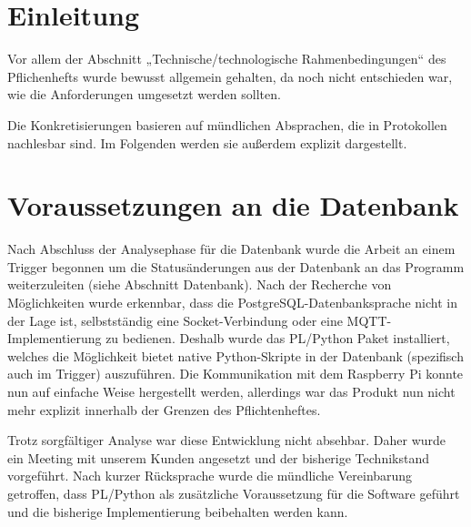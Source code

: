 \documentclass{scrartcl}
\date{}
\begin{document}
\maketitle
\renewcommand{\maketitle}{}
\renewcommand{\tableofcontents}{}

\section{Einleitung}
Vor allem der Abschnitt „Technische/technologische Rahmenbedingungen“ des Pflichenhefts wurde bewusst allgemein gehalten, da noch nicht entschieden war, wie die Anforderungen umgesetzt werden sollten. 

Die Konkretisierungen basieren auf mündlichen Absprachen, die in Protokollen nachlesbar sind. Im Folgenden werden sie außerdem explizit dargestellt.

\section{Voraussetzungen an die Datenbank}
Nach Abschluss der Analysephase für die Datenbank wurde die Arbeit an einem Trigger begonnen um die Statusänderungen aus der Datenbank an das Programm weiterzuleiten (siehe Abschnitt Datenbank). Nach der Recherche von Möglichkeiten wurde erkennbar, dass die PostgreSQL-Datenbanksprache nicht in der Lage ist, selbstständig eine Socket-Verbindung oder eine MQTT-Implementierung zu bedienen. Deshalb wurde das PL/Python Paket installiert, welches die Möglichkeit bietet native Python-Skripte in der Datenbank (spezifisch auch im Trigger) auszuführen. Die Kommunikation mit dem Raspberry Pi konnte nun auf einfache Weise hergestellt werden, allerdings war das Produkt nun nicht mehr explizit innerhalb der Grenzen des Pflichtenheftes.

Trotz sorgfältiger Analyse war diese Entwicklung nicht absehbar. Daher wurde ein Meeting mit unserem Kunden angesetzt und der bisherige Technikstand vorgeführt. Nach kurzer Rücksprache wurde die mündliche Vereinbarung getroffen, dass PL/Python als zusätzliche Voraussetzung für die Software geführt und die bisherige Implementierung beibehalten werden kann.
\end{document}
